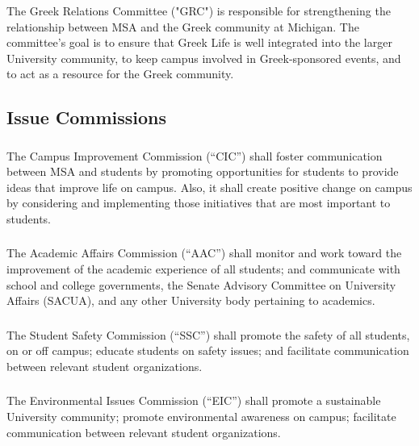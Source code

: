 \subsubsection{}
The Greek Relations Committee ("GRC") is responsible for strengthening the relationship between MSA and the Greek community at Michigan. The committee's goal is to ensure that Greek Life is well integrated into the larger University community, to keep campus involved in Greek-sponsored events, and to act as a resource for the Greek community.

\subsection{Issue Commissions}

\subsubsection{}
The Campus Improvement Commission (``CIC'') shall foster communication between MSA and students by promoting opportunities for students to provide ideas that improve life on campus. Also, it shall create positive change on campus by considering and implementing those initiatives that are most important to students.

\subsubsection{}
The Academic Affairs Commission (``AAC'') shall 
\subsubsubsection{}
monitor and work toward the improvement of the academic experience of all students; and
\subsubsubsection{}
communicate with school and college governments, the Senate Advisory Committee on University Affairs (SACUA), and any other University body pertaining to academics.

\subsubsection{}
The Student Safety Commission (``SSC'') shall promote the safety of all students, on or off campus; educate students on safety issues; and facilitate communication between relevant student organizations.

\subsubsection{}
The Environmental Issues Commission (``EIC'') shall
\subsubsubsection{}
promote a sustainable University community;
\subsubsubsection{}
promote environmental awareness on campus;
\subsubsubsection{}
facilitate communication between relevant student organizations.

